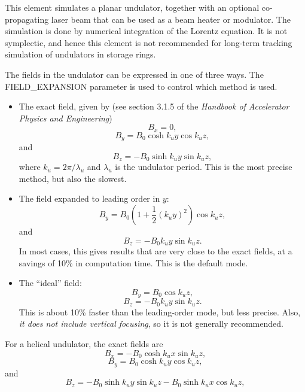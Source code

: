 This element simulates a planar undulator, together with an optional
co-propagating laser beam that can be used as a beam heater or
modulator.  The simulation is done by numerical integration of the
Lorentz equation.  It is not symplectic, and hence this element is not
recommended for long-term tracking simulation of undulators in storage
rings.  

The fields in the undulator can be expressed in one of three ways.
The FIELD\_EXPANSION parameter is used to control which method is used.
\begin{itemize}
\item The exact field, given by (see section 3.1.5 of the {\em Handbook of
Accelerator Physics and Engineering})
\begin{equation}
B_x = 0,
\end{equation}
\begin{equation}
B_y = B_0 \cosh k_u y \cos k_u z,
\end{equation}
and
\begin{equation}
B_z = -B_0 \sinh k_u y \sin k_u z ,
\end{equation}
where $k_u = 2\pi/\lambda_u$ and $\lambda_u$ is the undulator period.
This is the most precise method, but also the slowest.  

\item The field expanded to leading order in $y$:
\begin{equation}
B_y = B_0 ( 1 + \frac{1}{2}(k_u y)^2 ) \cos k_u z,
\end{equation}
and
\begin{equation}
B_z = -B_0 k_u y \sin k_u z.
\end{equation}
In most cases, this gives results that are very close to the exact fields,
at a savings of 10\% in computation time.
This is the default mode.

\item The ``ideal'' field:
\begin{equation}
B_y = B_0 \cos k_u z,
\end{equation}
\begin{equation}
B_z = -B_0 k_u y \sin k_u z.
\end{equation}
This is about 10\% faster than the leading-order mode, but less
precise.  Also, {\em it does not include vertical focusing}, so it is
not generally recommended.
\end{itemize}

For a helical undulator, the exact fields are
\begin{equation}
B_x = -B_0 \cosh k_u x \sin k_u z ,
\end{equation}
\begin{equation}
B_y = B_0 \cosh k_u y \cos k_u z,
\end{equation}
and
\begin{equation}
B_z = -B_0 \sinh k_u y \sin k_u z -B_0 \sinh k_u x \cos k_u z,
\end{equation}


